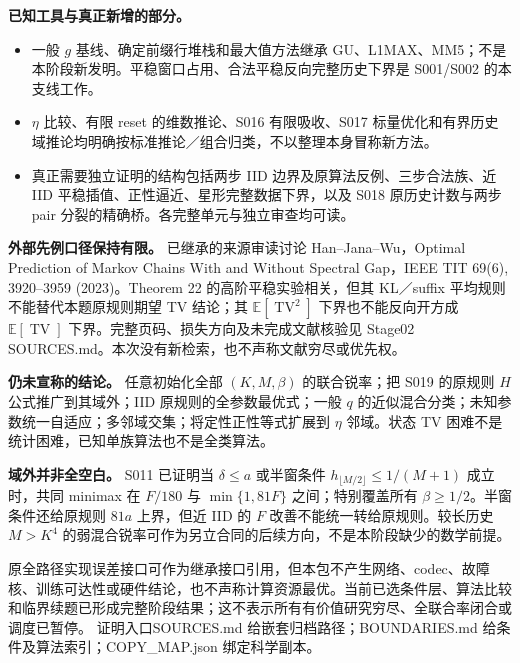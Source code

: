 \documentclass[11pt,a4paper]{article}
\newcommand{\TV}{\operatorname{TV}}\newcommand{\E}{\mathbb E}\newcommand{\R}{R_{\mathrm{D2}}}\newcommand{\Rp}{R_{\mathrm{D2}}^+}
\newcommand{\entry}[1]{\vfill\noindent\small 证明入口\quad #1\normalsize}
\begin{document}
\textbf{已知工具与真正新增的部分。}
\begin{itemize}
\item 一般 $g$ 基线、确定前缀行堆栈和最大值方法继承 GU、L1MAX、MM5；不是本阶段新发明。平稳窗口占用、合法平稳反向完整历史下界是 S001/S002 的本支线工作。
\item $\eta$ 比较、有限 reset 的维数推论、S016 有限吸收、S017 标量优化和有界历史域推论均明确按标准推论／组合归类，不以整理本身冒称新方法。
\item 真正需要独立证明的结构包括两步 IID 边界及原算法反例、三步合法族、近 IID 平稳插值、正性逼近、星形完整数据下界，以及 S018 原历史计数与两步 pair 分裂的精确桥。各完整单元与独立审查均可读。
\end{itemize}
\textbf{外部先例口径保持有限。} 已继承的来源审读讨论 Han--Jana--Wu，\textsf{Optimal Prediction of Markov Chains With and Without Spectral Gap}，IEEE TIT 69(6), 3920--3959 (2023)。Theorem 22 的高阶平稳实验相关，但其 KL／suffix 平均规则不能替代本题原规则期望 TV 结论；其 $\E[\TV^2]$ 下界也不能反向开方成 $\E[\TV]$ 下界。完整页码、损失方向及未完成文献核验见 Stage02 SOURCES.md。本次没有新检索，也不声称文献穷尽或优先权。

\textbf{仍未宣称的结论。} 任意初始化全部 $(K,M,\beta)$ 的联合锐率；把 S019 的原规则 $H$ 公式推广到其域外；IID 原规则的全参数最优式；一般 $q$ 的近似混合分类；未知参数统一自适应；多邻域交集；将定性正性等式扩展到 $\eta$ 邻域。状态 TV 困难不是统计困难，已知单族算法也不是全类算法。

\textbf{域外并非全空白。} S011 已证明当 $\delta\le a$ 或半窗条件 $h_{\lfloor M/2\rfloor}\le1/(M+1)$ 成立时，共同 minimax 在 $F/180$ 与 $\min\{1,81F\}$ 之间；特别覆盖所有 $\beta\ge1/2$。半窗条件还给原规则 $81a$ 上界，但近 IID 的 $F$ 改善不能统一转给原规则。较长历史 $M>K^4$ 的弱混合锐率可作为另立合同的后续方向，不是本阶段缺少的数学前提。

原全路径实现误差接口可作为继承接口引用，但本包不产生网络、codec、故障核、训练可达性或硬件结论，也不声称计算资源最优。当前已选条件层、算法比较和临界续题已形成完整阶段结果；这不表示所有有价值研究穷尽、全联合率闭合或调度已暂停。
\entry{SOURCES.md 给嵌套归档路径；BOUNDARIES.md 给条件及算法索引；COPY\_MAP.json 绑定科学副本。}
\par\smallskip{}\par
\end{document}
